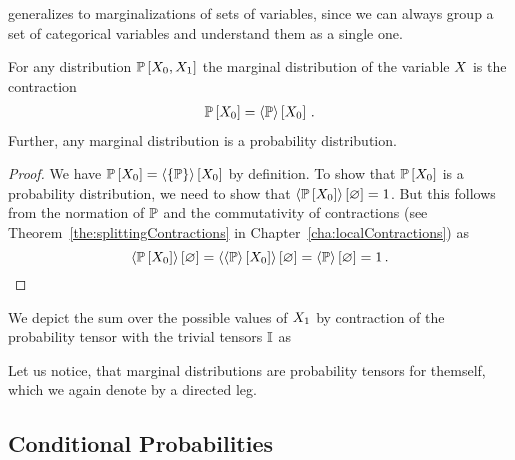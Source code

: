  generalizes to marginalizations of sets of variables, since we can always group a set of categorical variables and understand them as a single one.

\begin{theorem}\label{the:marginalContraction}
	For any distribution $\mathbb{P}\left[X_{0},X_{1}\right]$ the marginal distribution of the variable $X$ is the contraction
	\begin{align*}
		\mathbb{P}\left[X_{0}\right] = \left\langle \mathbb{P}\right\rangle \left[ X_{0} \right] \, .
	\end{align*}
	Further, any marginal distribution is a probability distribution.
\end{theorem}
\begin{proof}
	We have $\mathbb{P}\left[X_{0}\right] = \left\langle \{\mathbb{P}\}\right\rangle \left[ X_{0} \right]$ by definition.
	To show that $\mathbb{P}\left[X_{0}\right]$ is a probability distribution, we need to show that $\left\langle \mathbb{P}\left[X_{0}\right]\right\rangle \left[ \varnothing \right]=1$.
	But this follows from the normation of $\mathbb{P}$ and the commutativity of contractions (see Theorem~\ref{the:splittingContractions} in Chapter~\ref{cha:localContractions}) as
		\[ \left\langle \mathbb{P}\left[X_{0}\right]\right\rangle \left[ \varnothing \right] = 
		\left\langle 
			\left\langle \mathbb{P}\right\rangle \left[ X_{0} \right]
		\right\rangle \left[ \varnothing \right] =
		 \left\langle \mathbb{P}\right\rangle \left[ \varnothing \right]
		= 1 \, . 
		\]
\end{proof}

We depict the sum over the possible values of $X_{1}$ by contraction of the probability tensor with the trivial tensors $\mathbb{I}$ as 
\begin{center}
	
\end{center}
Let us notice, that marginal distributions are probability tensors for themself, which we again denote by a directed leg.


\subsection{Conditional Probabilities}


